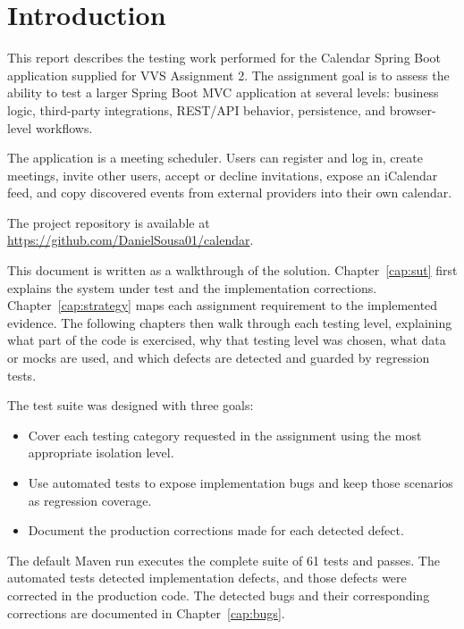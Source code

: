 \chapter{Introduction} \label{cap:introduction}

This report describes the testing work performed for the Calendar Spring Boot application supplied for VVS Assignment 2. The assignment goal is to assess the ability to test a larger Spring Boot MVC application at several levels: business logic, third-party integrations, REST/API behavior, persistence, and browser-level workflows.

The application is a meeting scheduler. Users can register and log in, create meetings, invite other users, accept or decline invitations, expose an iCalendar feed, and copy discovered events from external providers into their own calendar.

The project repository is available at \url{https://github.com/DanielSousa01/calendar}.

This document is written as a walkthrough of the solution. Chapter~\ref{cap:sut} first explains the system under test and the implementation corrections. Chapter~\ref{cap:strategy} maps each assignment requirement to the implemented evidence. The following chapters then walk through each testing level, explaining what part of the code is exercised, why that testing level was chosen, what data or mocks are used, and which defects are detected and guarded by regression tests.

The test suite was designed with three goals:

\begin{itemize}
\item Cover each testing category requested in the assignment using the most appropriate isolation level.
\item Use automated tests to expose implementation bugs and keep those scenarios as regression coverage.
\item Document the production corrections made for each detected defect.
\end{itemize}

The default Maven run executes the complete suite of 61 tests and passes.
The automated tests detected implementation defects, and those defects were corrected in the production code. The detected bugs and their corresponding corrections are documented in Chapter~\ref{cap:bugs}.
